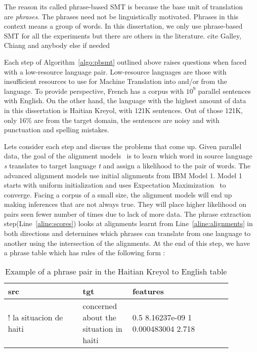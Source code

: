 The reason its called phrase-based SMT is because the base unit of translation are \emph{phrases}. The phrases need not be linguistically motivated. Phrases in this context means a group of words. In this dissertation, we only use phrase-based SMT for all the experiments but there are others in the literature.  \alert{cite Galley, Chiang and anybody else if needed} 

Each step of Algorithm~\ref{algo:pbsmt} outlined above raises questions when faced with a low-resource language pair. Low-resource languages are those with insufficient resources to use for Machine Translation into and/or from the language. To provide perspective, French has a corpus with $10^9$ parallel sentences with English. On the other hand, the language with the highest amount of data in this dissertation is Haitian Kreyol, with 121K sentences. Out of those 121K, only 16\% are from the target domain, the sentences are noisy and with punctuation and spelling mistakes.


Lets consider each step and discuss the problems that come up. Given parallel data, the goal of the alignment models~\cite{Brown:1993,Vogel:1996} is to learn which word in source language \emph{s} translates to target language \emph{t} and assign a likelihood to the pair of words. The advanced alignment models use initial alignments from IBM Model 1. Model 1 starts with uniform initialization and uses Expectation Maximization~\cite{Dempster:77} to converge. Facing a corpus of a small size, the alignment models will end up making inferences that are not always true. They will place higher likelihood on pairs seen fewer number of times due to lack of more data. The phrase extraction step(Line~\ref{aline:scores}) looks at alignments learnt from Line~\ref{aline:alignments} in both directions and determines which phrases can translate from one language to another using the intersection of the alignments. At the end of this step, we have a phrase table which has rules of the following form : 

\begin{table*}[ht]
\small
\small
\centering
\begin{tabular}{p{0.3\linewidth}p{0.2\linewidth}p{0.4\linewidth}}
\toprule
src & tgt & features \\
\toprule
! la situacion de haiti & concerned about the situation in haiti & 0.5 8.16237e-09 1 0.000483004 2.718 \\
\bottomrule
\end{tabular}
\caption{Example of a phrase pair in the Haitian Kreyol to English table}
\label{table:example_rule}
\end{table*}

